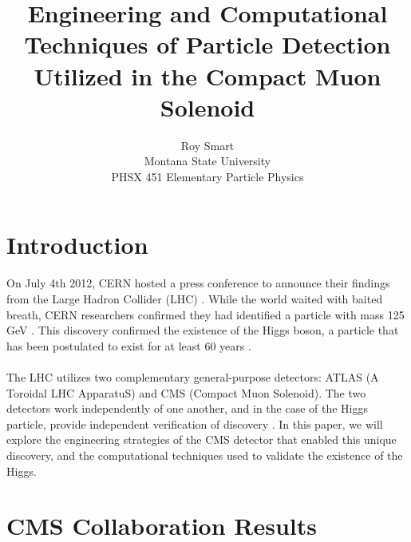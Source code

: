 \documentclass[12pt]{article}
\newcommand{\npar}{\\ \\ \noindent}
\begin{document}
\title{Engineering and Computational Techniques of Particle Detection Utilized in the Compact Muon Solenoid}
\author{Roy Smart \\ Montana State University \\PHSX 451 Elementary Particle Physics}
\maketitle

\section{Introduction}
On July 4th 2012, CERN hosted a press conference to announce their findings from the Large Hadron Collider (LHC) \cite{website:higgs_press}. While the world waited with baited breath, CERN researchers confirmed they had identified a particle with mass 125 GeV \cite{new_higgs}. This discovery confirmed the existence of the Higgs boson, a particle that has been postulated to exist for at least 60 years \cite{higgs_predict}. 
\npar
The LHC utilizes two complementary general-purpose detectors: ATLAS (A Toroidal LHC ApparatuS) and CMS (Compact Muon Solenoid). The two detectors work independently of one another, and in the case of the Higgs particle, provide independent verification of discovery \cite{lhc_combo}. In this paper, we will explore the engineering strategies of the CMS detector that enabled this unique discovery, and the computational techniques used to validate the existence of the Higgs.


\section{CMS Collaboration Results}
\end{document}

